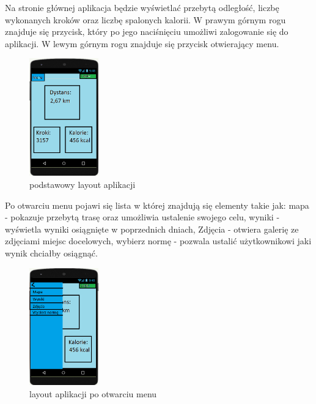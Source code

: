 \hspace{1cm}Na stronie głównej aplikacja będzie wyświetlać przebytą odległość, liczbę wykonanych kroków oraz liczbę spalonych kalorii. W prawym górnym rogu znajduje się przycisk, który po jego naciśnięciu umożliwi zalogowanie się do aplikacji. W lewym górnym rogu znajduje się przycisk otwierający menu.
	\begin{figure}[!htb]
		\begin{center}
				\includegraphics[width=3cm]{rys/Ap1.png}
				\caption{podstawowy layout aplikacji}
				\label{rys:rysunek001}
			\end{center}
	\end{figure}
\newline
Po otwarciu menu pojawi się lista w której znajdują się elementy takie jak: mapa - pokazuje przebytą trasę oraz umożliwia ustalenie swojego celu, wyniki - wyświetla wyniki osiągnięte w poprzednich dniach, Zdjęcia - otwiera galerię ze zdjęciami miejsc docelowych, wybierz normę - pozwala ustalić użytkownikowi jaki wynik chciałby osiągnąć.
\newline
  \begin{figure}[!htb]
	\begin{center}
		\includegraphics[width=3cm]{rys/Ap2.png}
		\caption{layout aplikacji po otwarciu menu}
		\label{rys:rysunek002}
	\end{center}
  \end{figure}






